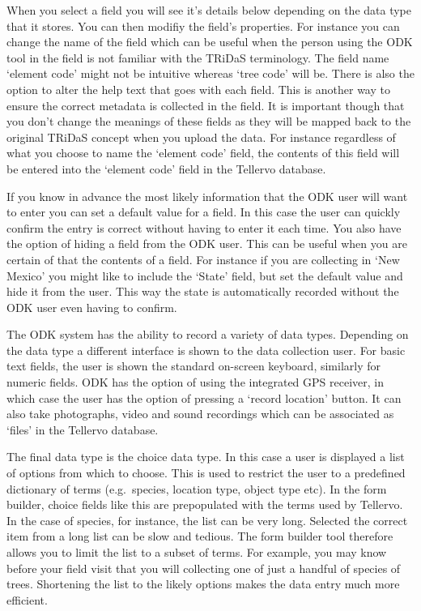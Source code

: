 When you select a field you will see  it's details below depending on the data type that it stores.  You can then modifiy the field's properties.  For instance you can change the name of the field which can be useful when the person using the ODK tool in the field is not familiar with the TRiDaS terminology.  The field name `element code' might not be intuitive whereas `tree code' will be.  There is also the option to alter the help text that goes with each field.  This is another way to ensure the correct metadata is collected in the field.  It is important though that you don't change the meanings of these fields as they will be mapped back to the original TRiDaS concept when you upload the data. For instance regardless of what you choose to name the `element code' field, the contents of this field will be entered into the `element code' field in the Tellervo database.

If you know in advance the most likely information that the ODK user will want to enter you can set a default value for a field.  In this case the user can quickly confirm the entry is correct without having to enter it each time.  You also have the option of hiding a field from the ODK user.  This can be useful when you are certain of that the contents of a field.  For instance if you are collecting in `New Mexico' you might like to include the `State' field, but set the default value and hide it from the user.  This way the state is automatically recorded without the ODK user even having to confirm.

The ODK system has the ability to record a variety of data types.  Depending on the data type a different interface is shown to the data collection user.  For basic text fields, the user is shown the standard on-screen keyboard, similarly for numeric fields.  ODK has the option of using the integrated GPS receiver, in which case the user has the option of pressing a `record location' button.  It can also take photographs, video and sound recordings which can be associated as `files' in the Tellervo database. 

The final data type is the choice data type.  In this case a user is displayed a list of options from which to choose.  This is used to restrict the user to a predefined dictionary of terms (e.g.\ species, location type, object type etc).  In the form builder, choice fields like this are prepopulated with the terms used by Tellervo.  In the case of species, for instance, the list can be very long.  Selected the correct item from a long list can be slow and tedious.  The form builder tool therefore allows you to limit the list to a subset of terms.  For example, you may know before your field visit that you will collecting one of just a handful of species of trees.  Shortening the list to the likely options makes the data entry much more efficient.

